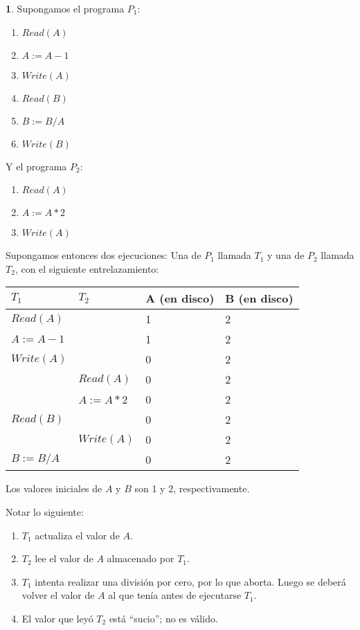 \documentclass[english,titlepage]{article}
\theoremstyle{definition}
\theoremstyle{definition}
\newtheorem{example}[thm]{\protect\examplename}
\providecommand{\examplename}{Ejemplo}
\begin{document}
\begin{example}
Supongamos el programa $P_1$:
\begin{enumerate}
    \item $Read(A)$
    \item $A := A - 1$
    \item $Write(A)$
    \item $Read(B)$
    \item $B := B/A$
    \item $Write(B)$
\end{enumerate}

Y el programa $P_2$:
\begin{enumerate}
    \item $Read(A)$
    \item $A := A*2$
    \item $Write(A)$
\end{enumerate}

Supongamos entonces dos ejecuciones: Una de $P_1$ llamada $T_1$ y una de $P_2$
llamada $T_2$, con el siguiente entrelazamiento:

\vspace{10pt}

\begin{tabular}{ l l l l }
  $T_1$         & $T_2$         & A (en disco)  & B (en disco)  \\
  \hline
  $Read(A)$     &               & 1             & 2             \\
  $A := A - 1$  &               & 1             & 2             \\
  $Write(A)$    &               & 0             & 2             \\
                & $Read(A)$     & 0             & 2             \\
                & $A := A*2$    & 0             & 2             \\
  $Read(B)$     &               & 0             & 2             \\
                & $Write(A)$    & 0             & 2             \\
  $B := B/A$    &               & 0             & 2             \\
\end{tabular}

\vspace{10pt}

Los valores iniciales de $A$ y $B$ son 1 y 2, respectivamente.

Notar lo siguiente:
\begin{enumerate}
    \item $T_1$ actualiza el valor de $A$.
    \item $T_2$ lee el valor de $A$ almacenado por $T_1$.
    \item $T_1$ intenta realizar una división por cero, por lo que aborta.
        Luego se deberá volver el valor de $A$ al que tenía antes de
        ejecutarse $T_1$.
    \item El valor que leyó $T_2$ está ``sucio''; no es válido.
\end{enumerate}
\end{example}
\end{document}

